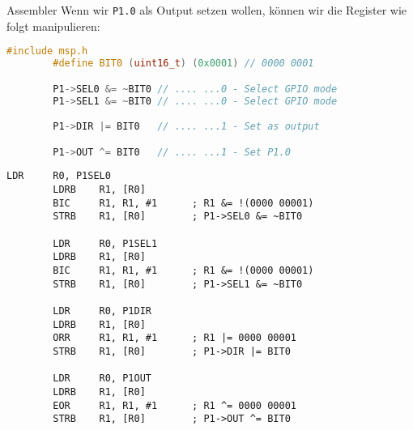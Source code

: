 \begin{example}{Assembler}
    Wenn wir \texttt{P1.0} als Output setzen wollen, können wir die Register wie folgt manipulieren:

    \begin{lstlisting}[language=c]
        #include msp.h
        #define BIT0 (uint16_t) (0x0001) // 0000 0001

        P1->SEL0 &= ~BIT0 // .... ...0 - Select GPIO mode
        P1->SEL1 &= ~BIT0 // .... ...0 - Select GPIO mode

        P1->DIR |= BIT0   // .... ...1 - Set as output

        P1->OUT ^= BIT0   // .... ...1 - Set P1.0
    \end{lstlisting}

    \begin{lstlisting}[language={[x86masm]Assembler}]
        LDR     R0, P1SEL0
        LDRB    R1, [R0]
        BIC     R1, R1, #1      ; R1 &= !(0000 00001)
        STRB    R1, [R0]        ; P1->SEL0 &= ~BIT0

        LDR     R0, P1SEL1
        LDRB    R1, [R0]
        BIC     R1, R1, #1      ; R1 &= !(0000 00001)
        STRB    R1, [R0]        ; P1->SEL1 &= ~BIT0

        LDR     R0, P1DIR
        LDRB    R1, [R0]
        ORR     R1, R1, #1      ; R1 |= 0000 00001
        STRB    R1, [R0]        ; P1->DIR |= BIT0

        LDR     R0, P1OUT
        LDRB    R1, [R0]
        EOR     R1, R1, #1      ; R1 ^= 0000 00001
        STRB    R1, [R0]        ; P1->OUT ^= BIT0
    \end{lstlisting}
\end{example}